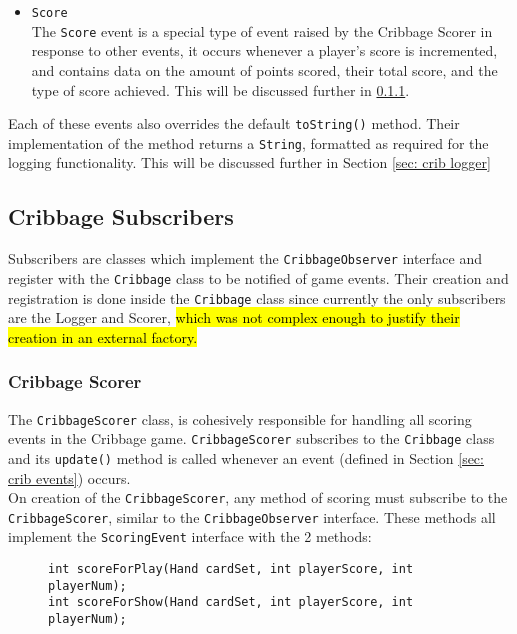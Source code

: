 \documentclass{article}
\begin{document}
\begin{itemize}
    \item \verb|Score|\\[2mm]
    The \verb|Score| event is a special type of event raised by the Cribbage Scorer in response to other events, it occurs whenever a player's score is incremented, and contains data on the amount of points scored, their total score, and the type of score achieved. This will be discussed further in \ref{sec: crib scorer}.
\end{itemize}
Each of these events also overrides the default \verb|toString()| method. Their implementation of the method returns a \verb|String|, formatted as required for the logging functionality. This will be discussed further in Section \ref{sec: crib logger}


\subsection{Cribbage Subscribers}
\label{sec: crib subscribers}
Subscribers are classes which implement the \verb|CribbageObserver| interface and register with the \verb|Cribbage| class to be notified of game events. Their creation and registration is done inside the \verb|Cribbage| class since currently the only subscribers are the Logger and Scorer, \hl{which was not complex enough to justify their creation in an external factory.}
\subsubsection{Cribbage Scorer}
\label{sec: crib scorer}
The \verb|CribbageScorer| class, is cohesively responsible for handling all scoring events in the Cribbage game. \verb|CribbageScorer| subscribes to the \verb|Cribbage| class and its \verb|update()| method is called whenever an event (defined in Section \ref{sec: crib events}) occurs.\\[2mm]

On creation of the \verb|CribbageScorer|, any method of scoring must subscribe to the \verb|CribbageScorer|, similar to the \verb|CribbageObserver| interface. These methods all implement the \verb|ScoringEvent| interface with the 2 methods:
\begin{figure}[H]
\centering
\begin{BVerbatim}
int scoreForPlay(Hand cardSet, int playerScore, int playerNum);
int scoreForShow(Hand cardSet, int playerScore, int playerNum);
\end{BVerbatim}
\end{figure}
\end{document}
